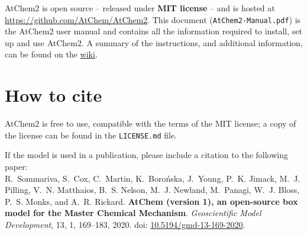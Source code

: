 AtChem2 is open source -- released under \textbf{MIT license} -- and is hosted
at \href{https://github.com/AtChem/AtChem2}{https://github.com/AtChem/AtChem2}.
This document (\texttt{AtChem2-Manual.pdf}) is the AtChem2 user manual
and contains all the information required to install, set up and use AtChem2.
A summary of the instructions, and additional information, can
be found on the \href{https://github.com/AtChem/AtChem2/wiki/}{wiki}.

\section{How to cite} \label{sec:how-to-cite}

AtChem2 is free to use, compatible with the terms of the MIT license;
a copy of the license can be found in the \texttt{LICENSE.md} file.

If the model is used in a publication, please include a citation to
the following paper:\\

R.~Sommariva, S.~Cox, C.~Martin, K.~Boro{\'n}ska, J.~Young, P.~K. Jimack,
M.~J. Pilling, V.~N. Matthaios, B.~S. Nelson, M.~J. Newland, M.~Panagi,
W.~J. Bloss, P.~S. Monks, and A.~R. Rickard.
\textbf{AtChem (version 1), an open-source box model for the Master Chemical Mechanism}.
\textit{Geoscientific Model Development}, 13, 1, 169--183, 2020.
doi: \href{https://doi.org/10.5194/gmd-13-169-2020}{10.5194/gmd-13-169-2020}.
